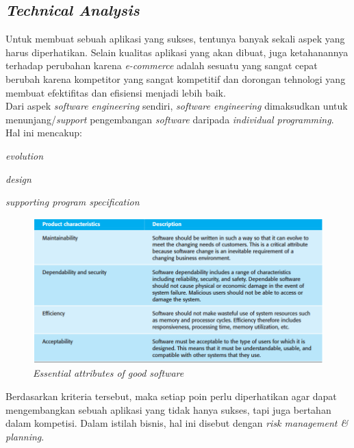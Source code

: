 
	\subsection{\textit{Technical Analysis}}
	\label{tech-analysis}
	
	Untuk membuat sebuah aplikasi yang sukses, tentunya banyak sekali aspek yang harus diperhatikan. Selain kualitas aplikasi yang akan dibuat, juga ketahanannya terhadap perubahan karena \textit{e-commerce} adalah sesuatu yang sangat cepat berubah karena kompetitor yang sangat kompetitif dan dorongan tehnologi yang membuat efektifitas dan efisiensi menjadi lebih baik.\\
	
	\indent Dari aspek \textit{software engineering} sendiri, \textit{software engineering} dimaksudkan untuk menunjang/\textit{support} pengembangan \textit{software} daripada \textit{individual programming}. Hal ini mencakup: \begin{inlinelist}
		\item \textit{evolution}
		\item \textit{design}
		\item \textit{supporting program specification}
	\end{inlinelist} \cite[p.~5]{software-engineering}
	
	\begin{figure}[H]
		\centering
		\includegraphics[width=\textwidth]{images/bab3/buku/essential-good-software.png}
		\caption{\textit{Essential attributes of good software}}
		\label{essential-software}
	\end{figure}
	
	\indent Berdasarkan kriteria tersebut, maka setiap poin perlu diperhatikan agar dapat mengembangkan sebuah aplikasi yang tidak hanya sukses, tapi juga bertahan dalam kompetisi. Dalam istilah bisnis, hal ini disebut dengan \textit{risk management \& planning}.
	

